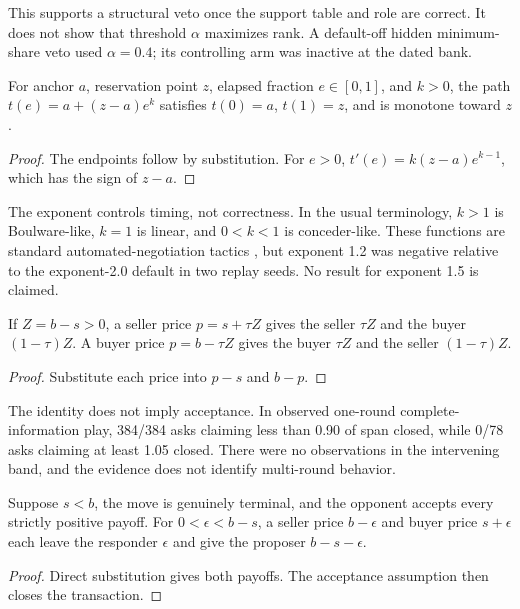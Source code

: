 This supports a structural veto once the support table and role are correct.
It does not show that threshold $\alpha$ maximizes rank. A default-off hidden
minimum-share veto used $\alpha=0.4$; its controlling arm was inactive at the
dated bank.

\begin{proposition}
For anchor $a$, reservation point $z$, elapsed fraction $e\in[0,1]$, and
$k>0$, the path $t(e)=a+(z-a)e^k$ satisfies $t(0)=a$, $t(1)=z$, and is monotone
toward $z$.
\end{proposition}
\begin{proof}
The endpoints follow by substitution. For $e>0$,
$t'(e)=k(z-a)e^{k-1}$, which has the sign of $z-a$.
\end{proof}

The exponent controls timing, not correctness. In the usual terminology,
$k>1$ is Boulware-like, $k=1$ is linear, and $0<k<1$ is conceder-like. These
functions are standard automated-negotiation tactics \citep{faratin1998negotiation}, but
exponent 1.2 was negative relative to the exponent-2.0 default in two replay
seeds. No result for exponent 1.5 is claimed.

\begin{proposition}
If $Z=b-s>0$, a seller price $p=s+\tau Z$ gives the seller $\tau Z$ and the
buyer $(1-\tau)Z$. A buyer price $p=b-\tau Z$ gives the buyer $\tau Z$ and the
seller $(1-\tau)Z$.
\end{proposition}
\begin{proof}
Substitute each price into $p-s$ and $b-p$.
\end{proof}

The identity does not imply acceptance. In observed one-round complete-
information play, 384/384 asks claiming less than 0.90 of span closed, while
0/78 asks claiming at least 1.05 closed. There were no observations in the
intervening band, and the evidence does not identify multi-round behavior.

\begin{proposition}
Suppose $s<b$, the move is genuinely terminal, and the opponent accepts every
strictly positive payoff. For $0<\epsilon<b-s$, a seller price $b-\epsilon$
and buyer price $s+\epsilon$ each leave the responder $\epsilon$ and give the
proposer $b-s-\epsilon$.
\end{proposition}
\begin{proof}
Direct substitution gives both payoffs. The acceptance assumption then closes
the transaction.
\end{proof}

